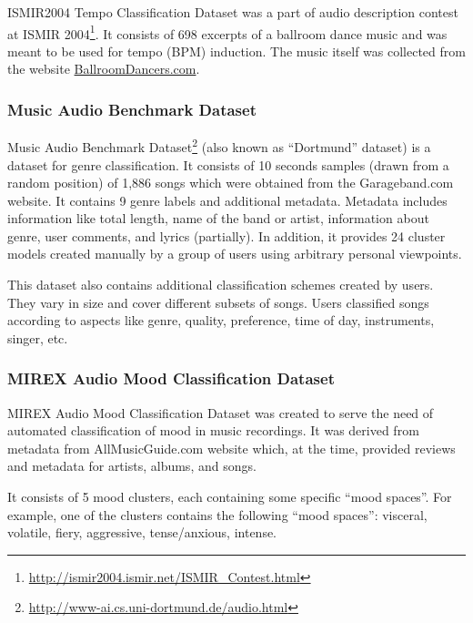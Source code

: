 ISMIR2004 Tempo Classification Dataset \cite{ballroom} was a part of audio description contest at ISMIR 2004\footnote{\url{http://ismir2004.ismir.net/ISMIR_Contest.html}}. It consists of 698 excerpts of a ballroom dance music and was meant to be used for tempo (BPM) induction. The music itself was collected from the website \href{http://www.ballroomdancers.com}{BallroomDancers.com}.

\subsubsection{Music Audio Benchmark Dataset}

Music Audio Benchmark Dataset\footnote{\url{http://www-ai.cs.uni-dortmund.de/audio.html}} \cite{dortmund} (also known as ``Dortmund'' dataset) is a dataset for genre classification. It consists of 10 seconds samples (drawn from a random position) of 1,886 songs which were obtained from the Garageband.com website. It contains 9 genre labels and additional metadata. Metadata includes information like total length, name of the band or artist, information about genre, user comments, and lyrics (partially). In addition, it provides 24 cluster models created manually by a group of users using arbitrary personal viewpoints.

This dataset also contains additional classification schemes created by users. They vary in size and cover different subsets of songs. Users classified songs according to aspects like genre, quality, preference, time of day, instruments, singer, etc.

\subsubsection{MIREX Audio Mood Classification Dataset}

MIREX Audio Mood Classification Dataset \cite{hu2007exploring,hu2008} was created to serve the need of automated classification of mood in music recordings. It was derived from metadata from AllMusicGuide.com website which, at the time, provided reviews and metadata for artists, albums, and songs. 

It consists of 5 mood clusters, each containing some specific ``mood spaces''. For example, one of the clusters contains the following ``mood spaces'': visceral, volatile, fiery, aggressive, tense/anxious, intense.


